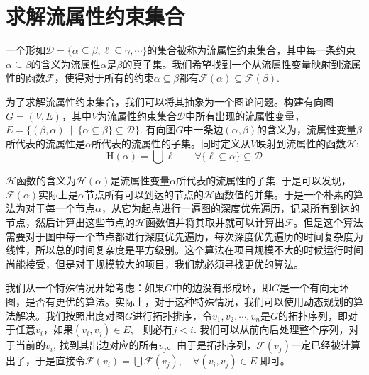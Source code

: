 \documentclass[UTF8, colorlinks]{pkuthss}
\begin{document}
	\section{求解流属性约束集合}
	一个形如$\mathcal{D} = \{\alpha\subseteq\beta, \ell\subseteq\gamma, \cdots\}$的集合被称为流属性约束集合，其中每一条约束$\alpha\subseteq\beta$的含义为流属性$\alpha$是$\beta$的真子集。我们希望找到一个从流属性变量映射到流属性的函数$\mathcal{F}$，使得对于所有的约束$\alpha\subseteq\beta$都有$\mathcal{F}(\alpha)\subseteq\mathcal{F}(\beta)$. 
	
	为了求解流属性约束集合，我们可以将其抽象为一个图论问题。构建有向图$G = (V, E)$，其中$V$为流属性约束集合$\mathcal{D}$中所有出现的流属性变量，$E = \{(\beta, \alpha)\ \mid\ \{\alpha\subseteq\beta\}\subseteq\mathcal{D}\}$. 	有向图$G$中一条边$(\alpha, \beta)$的含义为，流属性变量$\beta$所代表的流属性是$\alpha$所代表的流属性的子集。同时定义从$V$映射到流属性的函数$\mathcal{H}$:
	\begin{equation*}
		\mathrm{H}(\alpha) = \bigcup\ell\qquad\forall\{\ell\subseteq\alpha\}\subseteq\mathcal{D}
	\end{equation*}
	
	$\mathcal{H}$函数的含义为$\mathcal{H}(\alpha)$是流属性变量$\alpha$所代表的流属性的子集. 于是可以发现，$\mathcal{F}(\alpha)$实际上是$\alpha$节点所有可以到达的节点的$\mathcal{H}$函数值的并集。于是一个朴素的算法为对于每一个节点$\alpha$，从它为起点进行一遍图的深度优先遍历，记录所有到达的节点，然后计算出这些节点的$\mathcal{H}$函数值并将其取并就可以计算出$\mathcal{F}$。但是这个算法需要对于图中每一个节点都进行深度优先遍历，每次深度优先遍历的时间复杂度为线性，所以总的时间复杂度是平方级别。这个算法在项目规模不大的时候运行时间尚能接受，但是对于规模较大的项目，我们就必须寻找更优的算法。
	
	我们从一个特殊情况开始考虑：如果$G$中的边没有形成环，即$G$是一个有向无环图，是否有更优的算法。实际上，对于这种特殊情况，我们可以使用动态规划的算法解决。我们按照出度对图$G$进行拓扑排序，令$v_1, v_2, \cdots, v_n$是$G$的拓扑序列，即对于任意$v_i$，如果$(v_i, v_j) \in E$,　则必有$j < i$. 我们可以从前向后处理整个序列，对于当前的$v_i$, 找到其出边对应的所有$v_j$。由于是拓扑序列，$\mathcal{F}(v_j)$一定已经被计算出了，于是直接令$\mathcal{F}(v_i) = \bigcup\mathcal{F}(v_j),\quad\forall(v_i, v_j)\in E$ 即可。
	
\end{document}
